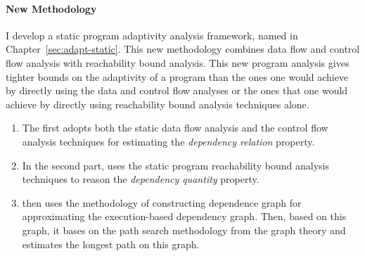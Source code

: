 \paragraph{New Methodology}
I develop a static program adaptivity analysis framework, named {\THESYSTEM} in Chapter~\ref{sec:adapt-static}.
This new methodology combines data flow and control flow analysis with reachability bound analysis.
This new program analysis gives tighter bounds on the adaptivity of a program than the ones one would achieve 
by directly using the data and control flow analyses or the ones that one would achieve 
by directly using reachability bound analysis techniques alone. 
\begin{enumerate}
\item The {\THESYSTEM} first adopts both the static data flow analysis and the control flow analysis techniques for
estimating the \emph{dependency relation} property.
\item In the second part, {\THESYSTEM} uses the static program reachability bound analysis techniques to reason the
\emph{dependency quantity} property.
\item 
{\THESYSTEM} then uses the methodology of constructing dependence graph for approximating the execution-based dependency graph.
Then, based on this graph, 
it bases on the path search methodology from the graph theory and estimates the longest path on this graph.
\end{enumerate}